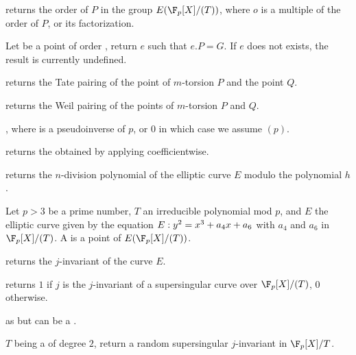 

 returns the
order of $P$ in the group $E(\F_p[X]/(T))$, where $o$ is a multiple of the
order of $P$, or its factorization.

 Let 
be a point of order , return $e$ such that $e.P=G$. If $e$ does not
exists, the result is currently undefined.

returns the Tate pairing of the point of $m$-torsion $P$ and the point $Q$.

returns the Weil pairing of the points of $m$-torsion $P$ and $Q$.

, where  is a pseudoinverse of $p$, or $0$ in which case we
assume $(p)$.

 returns the 
obtained by applying  coefficientwise.

returns the $n$-division polynomial of the elliptic curve $E$ modulo the
polynomial $h$.


Let $p > 3$ be a prime number, $T$ an irreducible polynomial mod $p$, and $E$
the elliptic curve given by the equation $E:y^2=x^3+a_4\*x+a_6$ with $a_4$ and
$a_6$ in $\F_p[X]/(T)$.  A  is a point of $E(\F_p[X]/(T))$.

returns the $j$-invariant of the curve $E$.

 returns $1$ if $j$ is
the $j$-invariant of a supersingular curve over $\F_p[X]/(T)$, $0$ otherwise.

as  but  can be a .

$T$ being a  of degree $2$, return a random supersingular $j$-invariant
in $\F_p[X]/T$.

